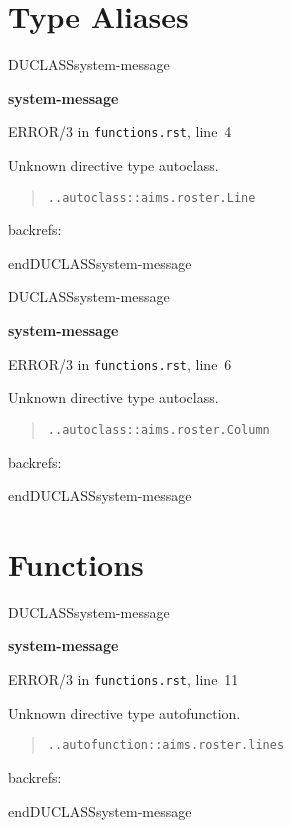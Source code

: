 \documentclass[a4paper]{article}
\newenvironment{DUclass}[1]%
  {%
   \def\DocutilsClassFunctionName{DUCLASS#1}
     \csname \DocutilsClassFunctionName \endcsname}%
  {\csname end\DocutilsClassFunctionName \endcsname}%
\newenvironment{DUadmonition}%
  {\begin{center}
     \begin{lrbox}{\DUadmonitionbox}
       \begin{minipage}{0.9\linewidth}
  }%
  {    \end{minipage}
     \end{lrbox}
     \fbox{\usebox{\DUadmonitionbox}}
   \end{center}
  }
\providecommand*{\DUtitle}[1]{%
  \smallskip\noindent\textbf{#1}\smallskip}
\begin{document}
\section{Type Aliases%
  \label{type-aliases}%
}

\begin{DUclass}{system-message}
\begin{DUadmonition}
\DUtitle{system-message
}

{\color{red}ERROR/3} in \texttt{functions.rst}, line~4

Unknown directive type \textquotedbl{}autoclass\textquotedbl{}.

\begin{quote}
\begin{alltt}
.. autoclass:: aims.roster.Line

\end{alltt}
\end{quote}
backrefs: \end{DUadmonition}
\end{DUclass}

\begin{DUclass}{system-message}
\begin{DUadmonition}
\DUtitle{system-message
}

{\color{red}ERROR/3} in \texttt{functions.rst}, line~6

Unknown directive type \textquotedbl{}autoclass\textquotedbl{}.

\begin{quote}
\begin{alltt}
.. autoclass:: aims.roster.Column

\end{alltt}
\end{quote}
backrefs: \end{DUadmonition}
\end{DUclass}


\section{Functions%
  \label{functions}%
}

\begin{DUclass}{system-message}
\begin{DUadmonition}
\DUtitle{system-message
}

{\color{red}ERROR/3} in \texttt{functions.rst}, line~11

Unknown directive type \textquotedbl{}autofunction\textquotedbl{}.

\begin{quote}
\begin{alltt}
.. autofunction:: aims.roster.lines

\end{alltt}
\end{quote}
backrefs: \end{DUadmonition}
\end{DUclass}
\end{document}
